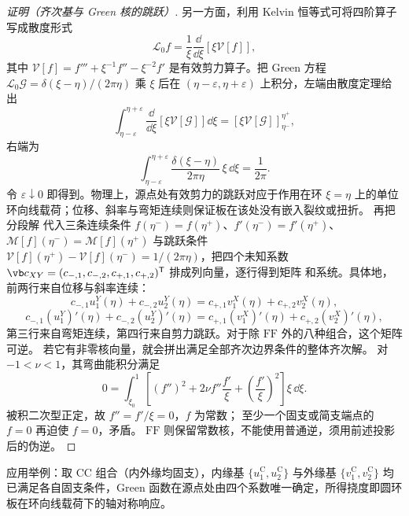 \begin{proof}[证明（齐次基与 Green 核的跳跃）]
另一方面，利用 Kelvin 恒等式可将四阶算子写成散度形式
\[
 \mathcal L_0f
 =\frac1\xi\frac{\dd}{\dd\xi}\!\left[\xi\mathcal V[f]\right],
\]
其中 \(\mathcal V[f]=f'''+\xi^{-1}f''-\xi^{-2}f'\) 是有效剪力算子。把 Green 方程 \(\mathcal L_0\mathcal G=\delta(\xi-\eta)/(2\pi\eta)\) 乘 \(\xi\) 后在 \((\eta-\varepsilon,\eta+\varepsilon)\) 上积分，左端由散度定理给出
\[
 \int_{\eta-\varepsilon}^{\eta+\varepsilon}
 \frac{\dd}{\dd\xi}\!\left[\xi\mathcal V[\mathcal G]\right]\dd\xi
 =\left[\xi\mathcal V[\mathcal G]\right]_{\eta^-}^{\eta^+},
\]
右端为
\[
 \int_{\eta-\varepsilon}^{\eta+\varepsilon}
 \frac{\delta(\xi-\eta)}{2\pi\eta}\,\xi\,\dd\xi
 =\frac1{2\pi}.
\]
令 \(\varepsilon\downarrow0\) 即得到。物理上，源点处有效剪力的跳跃对应于作用在环 \(\xi=\eta\) 上的单位环向线载荷；位移、斜率与弯矩连续则保证板在该处没有嵌入裂纹或扭折。
再把分段解 代入三条连续条件 \(f(\eta^-)=f(\eta^+)\)、\(f'(\eta^-)=f'(\eta^+)\)、\(\mathcal M[f](\eta^-)=\mathcal M[f](\eta^+)\) 与跳跃条件 \(\mathcal V[f](\eta^+)-\mathcal V[f](\eta^-)=1/(2\pi\eta)\)，把四个未知系数 \(\vb c_{XY}=(c_{-,1},c_{-,2},c_{+,1},c_{+,2})^{\mathsf T}\) 排成列向量，逐行得到矩阵 和系统。具体地，前两行来自位移与斜率连续：
\[
 c_{-,1}u_1^Y(\eta)+c_{-,2}u_2^Y(\eta)
 =c_{+,1}v_1^X(\eta)+c_{+,2}v_2^X(\eta),
\]
\[
 c_{-,1}(u_1^Y)'(\eta)+c_{-,2}(u_2^Y)'(\eta)
 =c_{+,1}(v_1^X)'(\eta)+c_{+,2}(v_2^X)'(\eta),
\]
第三行来自弯矩连续，第四行来自剪力跳跃。对于除 $\mathrm{FF}$ 外的八种组合，这个矩阵可逆。
若它有非零核向量，就会拼出满足全部齐次边界条件的整体齐次解。
对 $-1<\nu<1$，其弯曲能积分满足
\[
0=\int_{\xi_0}^1
\left[(f'')^2+2\nu f''\frac{f'}\xi+\left(\frac{f'}\xi\right)^2\right]\xi\,\dd\xi.
\]
被积二次型正定，故 $f''=f'/\xi=0$，$f$ 为常数；
至少一个固支或简支端点的 $f=0$ 再迫使 $f=0$，矛盾。
$\mathrm{FF}$ 则保留常数核，不能使用普通逆，须用前述投影后的伪逆。
\end{proof}
应用举例：取 $\mathrm{CC}$ 组合（内外缘均固支），内缘基 $\{u_1^{\mathrm C},u_2^{\mathrm C}\}$ 与外缘基 $\{v_1^{\mathrm C},v_2^{\mathrm C}\}$ 均已满足各自固支条件，Green 函数在源点处由四个系数唯一确定，所得挠度即圆环板在环向线载荷下的轴对称响应。
